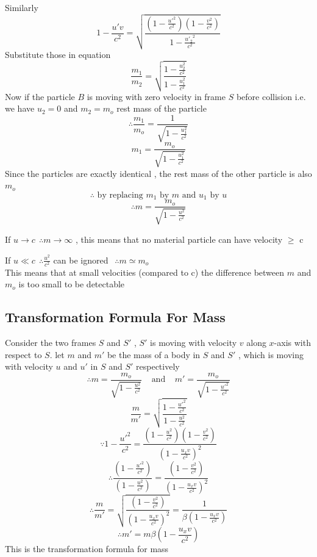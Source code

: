 Similarly
\[
    1-\frac{u' v}{c^2} = \sqrt{\frac{\left( 1 -\frac{{u'}^2}{c^2}\right) \left(1 - \frac{v^2}{c^2}\right)}{1-\frac{{u'_2}^2}{c^2}}}    
\]
Substitute those in equation 
\[
    \frac{m_1}{m_2} = \sqrt{\frac{1 - \frac{u^2_2}{c^2}}{1 - \frac{u^2_1}{c^2}}}    
\]
Now if the particle $B$ is moving with zero velocity in frame $S$ before collision i.e.
we have $u_2=0$ and $m_2=m_o$ rest mass of the particle
\[
\therefore  \frac{m_1}{m_o} = \frac{1}{\sqrt{1 - \frac{u^2_1}{c^2}}} 
\]
\[
    m_1 = \frac{m_o}{\sqrt{1 - \frac{u^2_1}{c^2}}} 
\]
Since the particles are exactly identical , the rest mass of the other particle is also $m_o$
\[
\therefore \text{ by replacing } m_1 \text{ by } m \text{ and } u_1 \text{ by } u
\]
\[
\therefore     m = \frac{m_o}{\sqrt{1 - \frac{u^2}{c^2}}} 
\]
\begin{observation}
    If $ u \to c \ \ \therefore m \to \infty$ , this means that no material particle can have velocity $\geq$ c
\end{observation}
\begin{observation}
    If $ u \ll c \ \ \therefore \frac{u^2}{c^2} $ can be ignored $ \ \ \therefore m \simeq m_o $\\
    This means that at small velocities (compared to c) the difference between $m$ and $m_o$ is too small to be detectable
\end{observation}
\subsection{Transformation Formula For Mass}
Consider the two frames $S$ and $S'$ , $S'$ is moving with velocity $v$ along $x$-axis with respect to $S$. let $m$ and $m'$ be the mass of a body in $S$ and $S'$ , which is moving with velocity $u$ and $u'$ in $S$ and $S'$ respectively
\[
\therefore     m = \frac{m_o}{\sqrt{1 - \frac{u^2}{c^2}}}  \ \ \ \ \  \text{and} \ \ \ \ \ m' = \frac{m_o}{\sqrt{1 - \frac{{u'}^2}{c^2}}} 
\]
\[
    \frac{m}{m'} = \sqrt{\frac{1 - \frac{{u'}^2}{c^2}}{1 - \frac{u^2}{c^2}}}        
\]
\[
\because 1-\frac{{u'}^2}{c^2} = \frac{\left( 1 -\frac{u^2}{c^2}\right) \left(1 - \frac{v^2}{c^2}\right)}{{\left(1-\frac{u_x v}{c^2}\right)}^2}    
\]
\[
\therefore \frac{\left(1-\frac{{u'}^2}{c^2}\right)}{\left( 1 -\frac{u^2}{c^2}\right)} = \frac{\left(1 - \frac{v^2}{c^2}\right)}{{\left(1-\frac{u_x v}{c^2}\right)}^2}     
\]
\[
\therefore \frac{m}{m'}  =\sqrt{\frac{\left(1 - \frac{v^2}{c^2}\right)}{{\left(1-\frac{u_x v}{c^2}\right)}^2}} = \frac{1}{\beta\left(1-\frac{u_x v}{c^2}\right)}
\]
\[
\therefore m' = m \beta\left(1-\frac{u_x v}{c^2}\right)
\]
This is the transformation formula for mass

